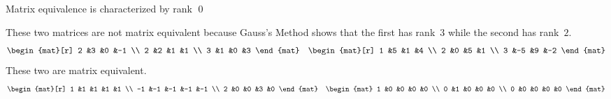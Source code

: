 \documentclass[10pt,t]{beamer}
\begin{document}
\begin{frame}{Matrix equivalence is characterized by rank}
\co[co:MatrixEquivalentIffSameRank]
\pause
\pf
{}
\qed

\pause
\ex
These two matrices are not matrix equivalent 
because Gauss's Method shows
that the first has rank~$3$ while the second has rank~$2$.
\begin{equation*}
  \begin{mat}[r]
    2  &3  &0 &-1 \\
    2  &2  &1 &1  \\
    3  &1  &0 &3
  \end{mat}
  \quad
  \begin{mat}[r]
    1  &5  &1 &4 \\
    2  &0  &5 &1  \\
    3  &-5 &9 &-2
  \end{mat}
\end{equation*}
\ex
These two are matrix equivalent.
\begin{equation*}
  \begin{mat}[r]
    1  &1  &1  &1  &1  \\
   -1  &-1 &-1 &-1 &-1 \\
    2  &0  &0  &3  &0 
  \end{mat}
  \quad
  \begin{mat}
    1  &0  &0  &0  &0  \\
    0  &1  &0  &0  &0  \\
    0  &0  &0  &0  &0
  \end{mat}
\end{equation*}
\end{frame}




% 
\end{document}
